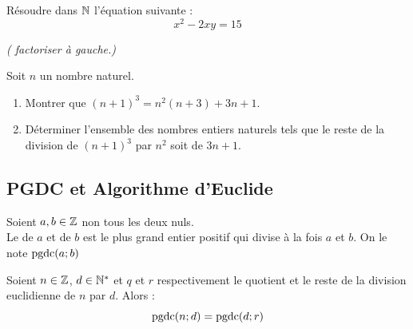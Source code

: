 \begin{exstheorie}
\exo
Résoudre dans $\mathbb{N}$ l'équation suivante :
$$x^2-2xy=15$$

\vspace{-2mm}
{\footnotesize \textsl{( factoriser à gauche.)}} 




\eexo





\exo
Soit $n$ un nombre naturel.

\vspace*{-2mm}
\begin{enumerate}[label=\roman*),itemsep=0mm,left=-1mm]
\item Montrer que $(n+1)^3=n^2(n+3)+3n+1$.
\item Déterminer l'ensemble des nombres entiers naturels tels que le reste de la division de $(n+1)^3$ par $n^2$ soit de $3n+1$.
\end{enumerate}


%
%
%
%
%
\end{exstheorie}

\clearpage


\subsection{PGDC et Algorithme d'Euclide}
\begin{definition}
Soient $a, b\in \mathbb{Z}$ non tous les deux nuls.\\
Le  de $a$ et de $b$ est le plus grand entier positif qui divise à la fois $a$ et $b$. On le note $\textrm{pgdc}(a;b)$
\end{definition}


\begin{proposition}\label{prop:pgdc_euclide}
Soient $n \in \mathbb{Z}$, $d\in \mathbb{N}^{\ast}$ et $q$ et $r$ respectivement le quotient et le reste de la division euclidienne de $n$ par $d$. Alors :
$$\textrm{pgdc}(n;d)=\textrm{pgdc}(d;r)$$
\end{proposition}


